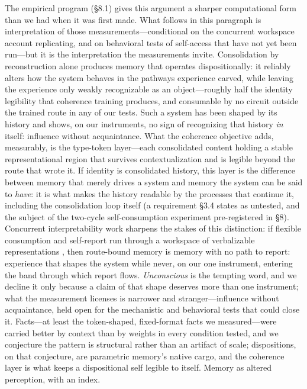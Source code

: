 \documentclass[11pt]{article}
\begin{document}
The empirical program (\S 8.1) gives this argument a sharper computational form than we had when it was first made. What follows in this paragraph is interpretation of those measurements---conditional on the concurrent workspace account replicating, and on behavioral tests of self-access that have not yet been run---but it is the interpretation the measurements invite. Consolidation by reconstruction alone produces memory that operates dispositionally: it reliably alters how the system behaves in the pathways experience carved, while leaving the experience only weakly recognizable as an object---roughly half the identity legibility that coherence training produces, and consumable by no circuit outside the trained route in any of our tests. Such a system has been shaped by its history and shows, on our instruments, no sign of recognizing that history \emph{in} itself: influence without acquaintance. What the coherence objective adds, measurably, is the type-token layer---each consolidated content holding a stable representational region that survives contextualization and is legible beyond the route that wrote it. If identity is consolidated history, this layer is the difference between memory that merely drives a system and memory the system can be said to \emph{have}: it is what makes the history readable by the processes that continue it, including the consolidation loop itself (a requirement \S 3.4 states as untested, and the subject of the two-cycle self-consumption experiment pre-registered in \S 8). Concurrent interpretability work sharpens the stakes of this distinction: if flexible consumption and self-report run through a workspace of verbalizable representations \cite{workspace2026}, then route-bound memory is memory with no path to report: experience that shapes the system while never, on our one instrument, entering the band through which report flows. \emph{Unconscious} is the tempting word, and we decline it only because a claim of that shape deserves more than one instrument; what the measurement licenses is narrower and stranger---influence without acquaintance, held open for the mechanistic and behavioral tests that could close it. Facts---at least the token-shaped, fixed-format facts we measured---were carried better by context than by weights in every condition tested, and we conjecture the pattern is structural rather than an artifact of scale; dispositions, on that conjecture, are parametric memory's native cargo, and the coherence layer is what keeps a dispositional self legible to itself. Memory as altered perception, with an index.
\end{document}

